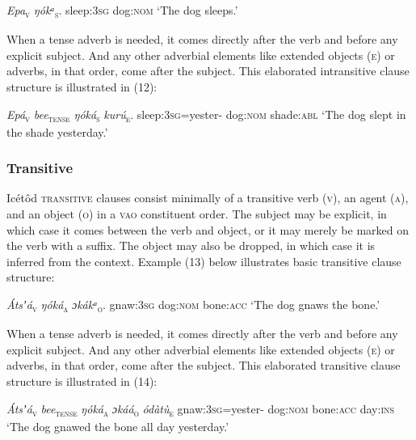 \textit{Epa}\textsc{\textsubscript{v}}\textsc{}    \textit{ŋókᵃ}\textsc{\textsubscript{s}}.
sleep:\textsc{3sg}   dog:\textsc{nom}
‘The dog sleeps.’


When a tense adverb is needed, it comes directly after the verb and before any explicit subject. And any other adverbial elements like extended objects (\textsc{e}) or adverbs, in that order, come after the subject. This elaborated intransitive clause structure is illustrated in (12):



\textit{Epá}\textsc{\textsubscript{v}} \textit{bee}\textsc{\textsubscript{tense}}\textit{   ŋóká}\textsc{\textsubscript{s}}\textit{     kurú}\textsc{\textsubscript{e}}.
sleep:\textsc{3sg}=yester-   dog:\textsc{nom}   shade:\textsc{abl}
‘The dog slept in the shade yesterday.’




\subsubsection{Transitive}

Icétôd \textsc{transitive} clauses consist minimally of a transitive verb (\textsc{v}), an agent (\textsc{a}), and an object (\textsc{o}) in a \textsc{vao} constituent order. The subject may be explicit, in which case it comes between the verb and object, or it may merely be marked on the verb with a suffix. The object may also be dropped, in which case it is inferred from the context. Example (13) below illustrates basic transitive clause structure:




\textit{Átsʼá}\textsc{\textsubscript{v}}    \textit{ŋóká}\textsc{\textsubscript{a}}\textit{    ɔkákᵃ}\textsc{\textsubscript{o}}\textsc{.}
gnaw:\textsc{3sg}  dog:\textsc{nom}  bone:\textsc{acc}
‘The dog gnaws the bone.’


When a tense adverb is needed, it comes directly after the verb and before any explicit subject. And any other adverbial elements like extended objects (\textsc{e}) or adverbs, in that order, come after the subject. This elaborated transitive clause structure is illustrated in (14):



\textit{Átsʼá}\textsc{\textsubscript{v}}\textit{ bee}\textsc{\textsubscript{tense}}\textit{   ŋóká}\textsc{\textsubscript{a}}\textit{     ɔkáá}\textsc{\textsubscript{o}}\textit{         ódàtù}\textsc{\textsubscript{e}}
gnaw:\textsc{3sg}=yester-  dog:\textsc{nom}  bone:\textsc{acc}  day:\textsc{ins}
‘The dog gnawed the bone all day yesterday.’




